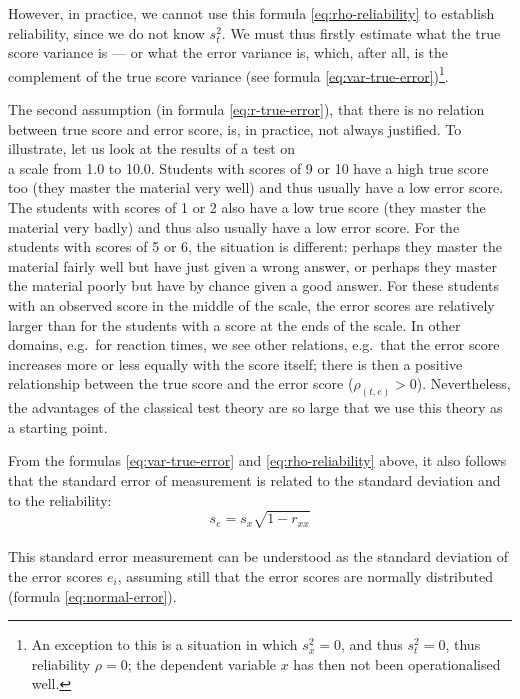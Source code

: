\documentclass[
]{book}
\begin{document}
However, in practice, we cannot use this formula \eqref{eq:rho-reliability} to
establish reliability, since we do not know \(s^2_t\). We must thus firstly
estimate what the true score variance is --- or what the error variance is, which, after all,
is the complement of the true score variance (see
formula \eqref{eq:var-true-error})\footnote{An exception to this is a situation in which \(s^2_x=0\), and thus \(s^2_t=0\), thus reliability \(\rho=0\); the dependent variable \(x\) has then not been
  operationalised well.}.

The second assumption (in formula \eqref{eq:r-true-error}), that there is no relation between
true score and error score, is, in practice, not always justified.
To illustrate, let us look at the results of a test on\\
a scale from 1.0 to 10.0. Students with scores of 9 or 10 have a high
true score too (they master the material very well) and thus usually have a low
error score. The students with scores of 1 or 2 also have a low true score
(they master the material very badly) and thus also usually have a low
error score. For the students with scores of 5 or 6,
the situation is different: perhaps they master the material fairly well
but have just given a wrong answer, or perhaps they master the material poorly but have by chance given a good answer. For these students with an observed
score in the middle of the scale, the error scores are relatively larger
than for the students with a score at the ends of the scale. In other domains,
e.g.~for reaction times, we see other relations, e.g.~that the error score increases
more or less equally with the score itself; there is then a positive relationship
between the true score and the error score (\(\rho_{(t,e)}>0\)). Nevertheless,
the advantages of the classical test theory are so large that we use this
theory as a starting point.

From the formulas \eqref{eq:var-true-error} and \eqref{eq:rho-reliability}
above, it also follows that the standard error of measurement is related to the
standard deviation and to the reliability:
\begin{equation}
   \label{eq:standard-error-measurement}
    s_e = s_x \sqrt{1-r_{xx}}
\end{equation}\\
This standard error measurement can be understood
as the standard deviation of the error scores \(e_i\), assuming still that
the error scores are normally distributed (formula \eqref{eq:normal-error}).
\end{document}
